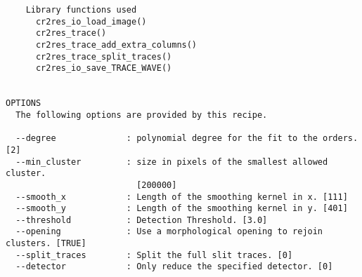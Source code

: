 \begin{verbatim}
    Library functions used                                                
      cr2res_io_load_image()                                              
      cr2res_trace()                                                      
      cr2res_trace_add_extra_columns()                                    
      cr2res_trace_split_traces()                                         
      cr2res_io_save_TRACE_WAVE()                                         
  

OPTIONS
  The following options are provided by this recipe.

  --degree              : polynomial degree for the fit to the orders. [2]
  --min_cluster         : size in pixels of the smallest allowed cluster.
                          [200000]
  --smooth_x            : Length of the smoothing kernel in x. [111]
  --smooth_y            : Length of the smoothing kernel in y. [401]
  --threshold           : Detection Threshold. [3.0]
  --opening             : Use a morphological opening to rejoin clusters. [TRUE]
  --split_traces        : Split the full slit traces. [0]
  --detector            : Only reduce the specified detector. [0]

\end{verbatim}
